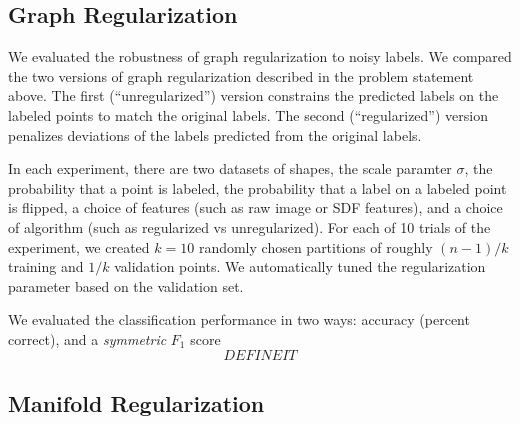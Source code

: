 \documentclass[anon,11pt]{9520} %
\begin{document}
\subsection{Graph Regularization}
We evaluated the robustness of graph regularization to noisy labels. We compared the two versions of graph regularization described in the problem statement above. The first (``unregularized'') version constrains the predicted labels on the labeled points to match the original labels. The second (``regularized'') version penalizes deviations of the labels predicted from the original labels.

In each experiment, there are two datasets of shapes, the scale paramter $\sigma$, the probability that a point is labeled, the probability that a label on a labeled point is flipped, a choice of features (such as raw image or SDF features), and a choice of algorithm (such as regularized vs unregularized). For each of 10 trials of the experiment, we created $k=10$ randomly chosen partitions of roughly $(n-1)/k$ training and $1/k$ validation points. We automatically tuned the regularization parameter based on the validation set.

We evaluated the classification performance in two ways: accuracy (percent correct), and a {\em symmetric} $F_1$ score \[DEFINE IT\]
\subsection{Manifold Regularization}
\end{document}

